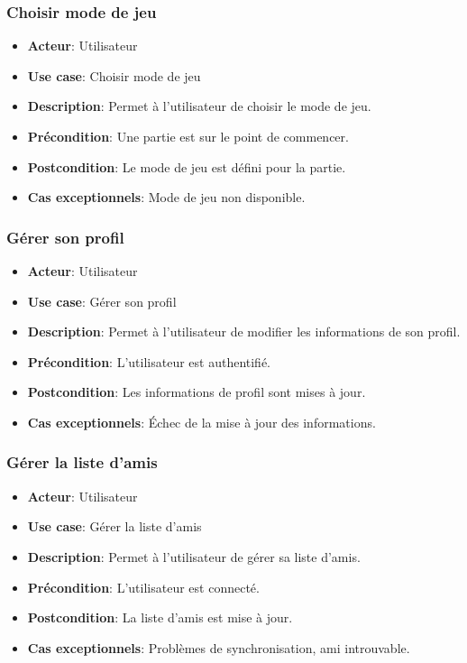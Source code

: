 \documentclass{article}
\begin{document}
\subsubsection*{Choisir mode de jeu}
\begin{itemize}
    \item \textbf{Acteur}: Utilisateur
    \item \textbf{Use case}: Choisir mode de jeu
    \item \textbf{Description}: Permet à l'utilisateur de choisir le mode de jeu.
    \item \textbf{Précondition}: Une partie est sur le point de commencer.
    \item \textbf{Postcondition}: Le mode de jeu est défini pour la partie.
    \item \textbf{Cas exceptionnels}: Mode de jeu non disponible.
\end{itemize}

\subsubsection*{Gérer son profil}
\begin{itemize}
    \item \textbf{Acteur}: Utilisateur
    \item \textbf{Use case}: Gérer son profil
    \item \textbf{Description}: Permet à l'utilisateur de modifier les informations de son profil.
    \item \textbf{Précondition}: L'utilisateur est authentifié.
    \item \textbf{Postcondition}: Les informations de profil sont mises à jour.
    \item \textbf{Cas exceptionnels}: Échec de la mise à jour des informations.
\end{itemize}

\subsubsection*{Gérer la liste d'amis}
\begin{itemize}
    \item \textbf{Acteur}: Utilisateur
    \item \textbf{Use case}: Gérer la liste d'amis
    \item \textbf{Description}: Permet à l'utilisateur de gérer sa liste d'amis.
    \item \textbf{Précondition}: L'utilisateur est connecté.
    \item \textbf{Postcondition}: La liste d'amis est mise à jour.
    \item \textbf{Cas exceptionnels}: Problèmes de synchronisation, ami introuvable.
\end{itemize}
\end{document}
